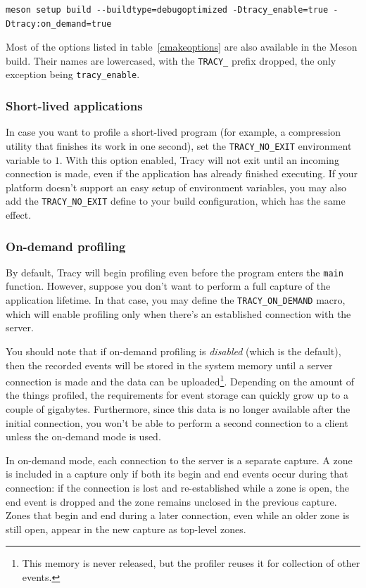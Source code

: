 \documentclass[hidelinks,titlepage,a4paper,twoside]{article}
\begin{document}
\begin{lstlisting}
meson setup build --buildtype=debugoptimized -Dtracy_enable=true -Dtracy:on_demand=true
\end{lstlisting}

Most of the options listed in table~\ref{cmakeoptions} are also available in the Meson build. Their names are lowercased, with the \texttt{TRACY\_} prefix dropped, the only exception being \texttt{tracy\_enable}.

\subsubsection{Short-lived applications}

In case you want to profile a short-lived program (for example, a compression utility that finishes its work in one second), set the \texttt{TRACY\_NO\_EXIT} environment variable to $1$. With this option enabled, Tracy will not exit until an incoming connection is made, even if the application has already finished executing. If your platform doesn't support an easy setup of environment variables, you may also add the \texttt{TRACY\_NO\_EXIT} define to your build configuration, which has the same effect.

\subsubsection{On-demand profiling}
\label{ondemand}

By default, Tracy will begin profiling even before the program enters the \texttt{main} function. However, suppose you don't want to perform a full capture of the application lifetime. In that case, you may define the \texttt{TRACY\_ON\_DEMAND} macro, which will enable profiling only when there's an established connection with the server.

You should note that if on-demand profiling is \emph{disabled} (which is the default), then the recorded events will be stored in the system memory until a server connection is made and the data can be uploaded\footnote{This memory is never released, but the profiler reuses it for collection of other events.}. Depending on the amount of the things profiled, the requirements for event storage can quickly grow up to a couple of gigabytes. Furthermore, since this data is no longer available after the initial connection, you won't be able to perform a second connection to a client unless the on-demand mode is used.

In on-demand mode, each connection to the server is a separate capture. A zone is included in a capture only if both its begin and end events occur during that connection: if the connection is lost and re-established while a zone is open, the end event is dropped and the zone remains unclosed in the previous capture. Zones that begin and end during a later connection, even while an older zone is still open, appear in the new capture as top-level zones.
\end{document}
